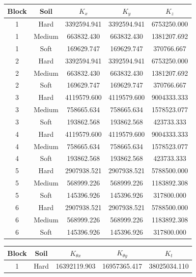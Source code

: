 \clearpage\noindent\begin{minipage}{\linewidth}
\fontsize{11}{13}\selectfont\setlength{\tabcolsep}{4pt}
\label{tab:spring_stiffness_methodology}\centering\renewcommand{\arraystretch}{0.82}
\begin{tabular*}{\linewidth}{@{\extracolsep{\fill}}ccccc@{}}
\toprule
Block & Soil & $K_x$ & $K_y$ & $K_z$ \\ \midrule
1 & Hard & 3392594.941 & 3392594.941 & 6753250.000 \\
1 & Medium & 663832.430 & 663832.430 & 1381207.692 \\
1 & Soft & 169629.747 & 169629.747 & 370766.667 \\
2 & Hard & 3392594.941 & 3392594.941 & 6753250.000 \\
2 & Medium & 663832.430 & 663832.430 & 1381207.692 \\
2 & Soft & 169629.747 & 169629.747 & 370766.667 \\
3 & Hard & 4119579.600 & 4119579.600 & 9004333.333 \\
3 & Medium & 758665.634 & 758665.634 & 1578523.077 \\
3 & Soft & 193862.568 & 193862.568 & 423733.333 \\
4 & Hard & 4119579.600 & 4119579.600 & 9004333.333 \\
4 & Medium & 758665.634 & 758665.634 & 1578523.077 \\
4 & Soft & 193862.568 & 193862.568 & 423733.333 \\
5 & Hard & 2907938.521 & 2907938.521 & 5788500.000 \\
5 & Medium & 568999.226 & 568999.226 & 1183892.308 \\
5 & Soft & 145396.926 & 145396.926 & 317800.000 \\
6 & Hard & 2907938.521 & 2907938.521 & 5788500.000 \\
6 & Medium & 568999.226 & 568999.226 & 1183892.308 \\
6 & Soft & 145396.926 & 145396.926 & 317800.000 \\
\bottomrule
\end{tabular*}
\par\smallskip
\begin{tabular*}{\linewidth}{@{\extracolsep{\fill}}ccccc@{}}
\toprule
Block & Soil & $K_{\theta x}$ & $K_{\theta y}$ & $K_t$ \\ \midrule
1 & Hard & 16392119.903 & 16957365.417 & 38025034.110 \\

\end{tabular*}
\end{minipage}
